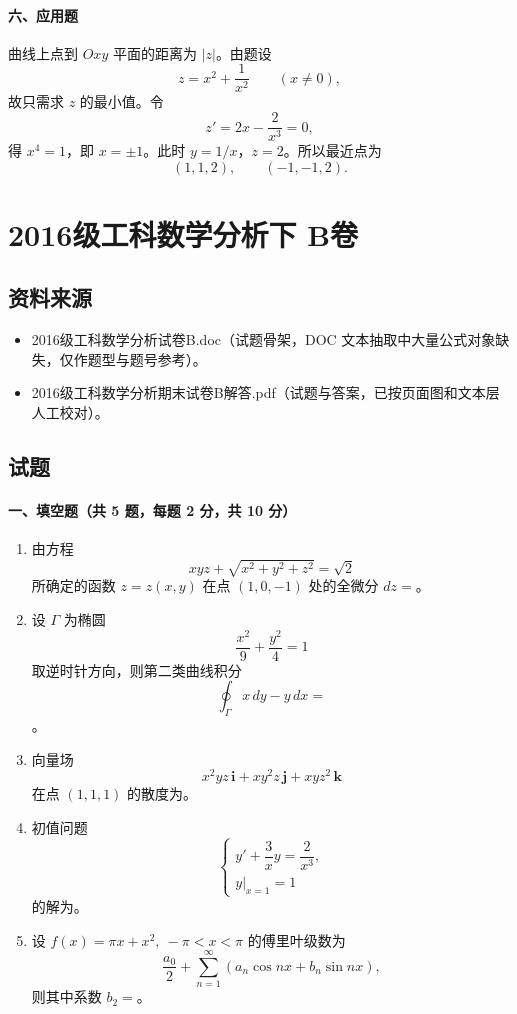 \paragraph*{六、应用题}
曲线上点到 \(Oxy\) 平面的距离为 \(|z|\)。由题设
\[
  z=x^2+\frac1{x^2}\qquad (x\ne0),
\]
故只需求 \(z\) 的最小值。令
\[
  z'=2x-\frac2{x^3}=0,
\]
得 \(x^4=1\)，即 \(x=\pm1\)。此时 \(y=1/x\)，\(z=2\)。所以最近点为
\[
  (1,1,2),\qquad (-1,-1,2).
\]

\section{2016级工科数学分析下 B卷}

\subsection{资料来源}
\begin{itemize}
  \item 2016级工科数学分析试卷B.doc（试题骨架，DOC 文本抽取中大量公式对象缺失，仅作题型与题号参考）。
  \item 2016级工科数学分析期末试卷B解答.pdf（试题与答案，已按页面图和文本层人工校对）。
\end{itemize}

\subsection{试题}

\paragraph*{一、填空题（共 5 题，每题 2 分，共 10 分）}
\begin{enumerate}
  \item 由方程
  \[
    xyz+\sqrt{x^2+y^2+z^2}=\sqrt2
  \]
  所确定的函数 $z=z(x,y)$ 在点 $(1,0,-1)$ 处的全微分 $dz=$\underline{\hspace{4cm}}。

  \item 设 $\Gamma$ 为椭圆
  \[
    \frac{x^2}{9}+\frac{y^2}{4}=1
  \]
  取逆时针方向，则第二类曲线积分
  \[
    \oint_\Gamma x\,dy-y\,dx=
  \]
  \underline{\hspace{4cm}}。

  \item 向量场
  \[
    x^2yz\,\mathbf i+xy^2z\,\mathbf j+xyz^2\,\mathbf k
  \]
  在点 $(1,1,1)$ 的散度为\underline{\hspace{4cm}}。

  \item 初值问题
  \[
    \begin{cases}
      y'+\dfrac{3}{x}y=\dfrac{2}{x^3},\\
      y|_{x=1}=1
    \end{cases}
  \]
  的解为\underline{\hspace{4cm}}。

  \item 设 $f(x)=\pi x+x^2,\ -\pi<x<\pi$ 的傅里叶级数为
  \[
    \frac{a_0}{2}+\sum_{n=1}^{\infty}(a_n\cos nx+b_n\sin nx),
  \]
  则其中系数 $b_2=$\underline{\hspace{4cm}}。
\end{enumerate}

